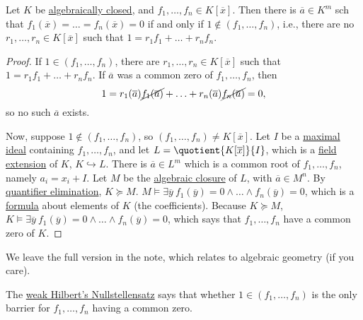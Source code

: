 \begin{theorem}\label{thm:weak-Hilbert-Nullstellensatz}
	Let \(K\) be \hyperref[def:algebraically-closed]{algebraically closed}, and \(f_1, \ldots , f_n\in K[\overline{x} ]\). Then there is \(\overline{a} \in K^m\) sch that \(f_1(\overline{x} ) = \ldots = f_n(\overline{x} ) = 0\) if and only if \(1 \notin (f_1, \ldots , f_n)\), i.e., there are no \(r_1, \ldots , r_n\in K[\overline{x} ]\) such that \(1 = r_1 f_1 + \ldots + r_n f_n\).
\end{theorem}
\begin{proof}
	If \(1\in (f_1, \ldots , f_n)\), there are \(r_1, \ldots , r_n\in K[\overline{x} ]\) such that \(1 = r_1 f_1 + \ldots + r_n f_n\). If \(\overline{a} \) was a common zero of \(f_1, \ldots , f_n\), then
	\[
		1 = r_1(\overline{a} ) \cancel{f_1(\overline{a} )} + \ldots + r_n(\overline{a} ) \cancel{f_n(\overline{a} )} = 0,
	\]
	so no such \(\overline{a} \) exists.

	Now, suppose \(1 \notin (f_1, \ldots , f_n)\), so \((f_1, \ldots , f_n) \neq K[\overline{x} ]\). Let \(I\) be a \hyperref[def:maximal]{maximal} \hyperref[def:ideal]{ideal} containing \(f_1, \ldots , f_n\), and let \(L = \quotient{K[\overline{x} ]}{I} \), which is a \hyperref[def:field-extension]{field extension} of \(K\), \(K\hookrightarrow L\). There is \(\overline{a} \in L^m\) which is a common root of \(f_1, \ldots , f_n\), namely \(a_i = x_i + I\). Let \(M\) be the \hyperref[def:algebraic-closure]{algebraic closure} of \(L\), with \(\overline{a} \in M^n\). By \hyperref[def:quantifier-elimination]{quantifier elimination}, \(K \succeq M\). \(M \models \exists \overline{y} \ f_1(\overline{y} ) = 0 \land \ldots \land f_n(\overline{y} ) = 0\), which is a \hyperref[def:formula]{formula} about elements of \(K\) (the coefficients). Because \(K \succeq M\), \(K \models \exists \overline{y} \ f_1(\overline{y} ) = 0 \land \ldots \land f_n(\overline{y} ) = 0\), which says that \(f_1, \ldots , f_n\) have a common zero of \(K\).
\end{proof}

\begin{note}
	We leave the full version in the note, which relates to algebraic geometry (if you care).
\end{note}

\begin{remark}
	The \hyperref[thm:weak-Hilbert-Nullstellensatz]{weak Hilbert's Nullstellensatz} says that whether \(1\in (f_1, \ldots , f_n)\) is the only barrier for \(f_1, \ldots , f_n\) having a common zero.
\end{remark}

